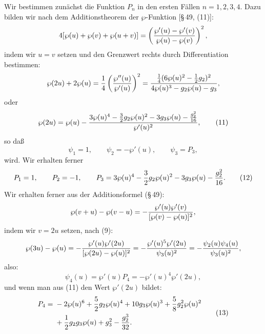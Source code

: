 \documentclass[11pt]{article}
\begin{document}
Wir bestimmen zunächst die Funktion $P_n$ in den ersten Fällen $n=1,2,3,4$. Dazu bilden
wir nach dem Additionstheorem der $\wp$-Funktion [\S\,49, (11)]:
\[
4[\wp(u)+\wp(v)+\wp(u+v)]
=\left({\wp'(u)-\wp'(v)\over \wp(u)-\wp(v)}\right)^2,
\]
indem wir $u=v$ setzen und den Grenzwert rechts durch Differentiation bestimmen:
\[
\wp(2u)+2\wp(u)
={1\over4}\left({\wp''(u)\over\wp'(u)}\right)^2
={\frac14(6\wp(u)^2-\frac12g_2)^2\over 4\wp(u)^3-g_2\wp(u)-g_3},
\]
oder
\begin{equation}
\wp(2u)=\wp(u)-
{3\wp(u)^4-\frac32 g_2\wp(u)^2-3g_3\wp(u)-\frac{g_2^2}{16}
\over \wp'(u)^2},
\tag{11}
\end{equation}
so daß
\[
\psi_1=1,\qquad \psi_2=-\wp'(u),\qquad \psi_3=P_3,
\]
wird. Wir erhalten ferner
\begin{equation}
P_1=1,\qquad P_2=-1,\qquad
P_3=3\wp(u)^4-\frac32g_2\wp(u)^2-3g_3\wp(u)-{g_2^2\over16}.
\tag{12}
\end{equation}
Wir erhalten ferner aus der Additionsformel (\S\,49):
\[
\wp(v+u)-\wp(v-u)=-{\wp'(u)\wp'(v)\over[\wp(v)-\wp(u)]^2},
\]
indem wir $v=2u$ setzen, nach (9):
\[
\wp(3u)-\wp(u)
=-{\wp'(u)\wp'(2u)\over[\wp(2u)-\wp(u)]^2}
=-{\wp'(u)^5\wp'(2u)\over\psi_3(u)^2}
=-{\psi_2(u)\psi_4(u)\over\psi_3(u)^2},
\]
also:
\[
\psi_4(u)=\wp'(u)P_4=-\wp'(u)^4\wp'(2u),
\]
und wenn man aus (11) den Wert $\wp'(2u)$ bildet:
\begin{equation}
\begin{aligned}
P_4={}&-2\wp(u)^6+{5\over2}g_2\wp(u)^4+10g_3\wp(u)^3
+{5\over8}g_2^2\wp(u)^2\\
&+{1\over2}g_2g_3\wp(u)+g_3^2-{g_2^3\over32}.
\end{aligned}
\tag{13}
\end{equation}
\end{document}
